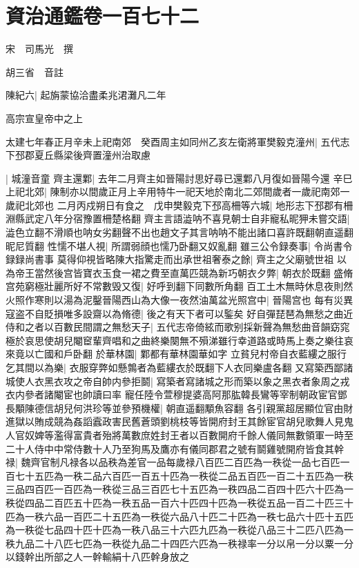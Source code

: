 \section{資治通鑑卷一百七十二}
宋　司馬光　撰

胡三省　音註

陳紀六|{
	起旃蒙協洽盡柔兆涒灘凡二年}


高宗宣皇帝中之上

太建七年春正月辛未上祀南郊　癸酉周主如同州乙亥左衛將軍樊毅克潼州|{
	五代志下邳郡夏丘縣梁後齊置潼州治取慮}


|{
	城潼音童}
齊主還鄴|{
	去年二月齊主如晉陽討思好尋已還鄴八月復如晉陽今還}
辛巳上祀北郊|{
	陳制亦以間歲正月上辛用特牛一祀天地於南北二郊間歲者一歲祀南郊一歲祀北郊也}
二月丙戍朔日有食之　戊申樊毅克下邳高柵等六城|{
	地形志下邳郡有柵淵縣武定八年分宿豫置柵楚格翻}
齊主言語澁呐不喜見朝士自非寵私昵狎未嘗交語|{
	澁色立翻不滑順也呐女劣翻聲不出也趙文子其言呐呐不能出諸口喜許既翻朝直遥翻昵尼質翻}
性懦不堪人視|{
	所謂弱顔也懦乃卧翻又奴亂翻}
雖三公令録奏事|{
	令尚書令録録尚書事}
莫得仰視皆略陳大指驚走而出承世祖奢泰之餘|{
	齊主之父廟號世祖}
以為帝王當然後宫皆寶衣玉食一裙之費至直萬匹競為新巧朝衣夕弊|{
	朝衣於既翻}
盛脩宫苑窮極壯麗所好不常數毁又復|{
	好呼到翻下同數所角翻}
百工土木無時休息夜則然火照作寒則以湯為泥鑿晉陽西山為大像一夜然油萬盆光照宫中|{
	晉陽宫也}
每有災異寇盗不自貶損唯多設齋以為脩德|{
	後之有天下者可以鍳矣}
好自彈琵琶為無愁之曲近侍和之者以百數民間謂之無愁天子|{
	五代志帝倚絃而歌别採新聲為無愁曲音韻窈窕極於哀思使胡兒閹䆠輩齊唱和之曲終樂闋無不殞涕雖行幸道路或時馬上奏之樂往哀來竟以亡國和戶卧翻}
於華林園|{
	鄴都有華林園華如字}
立貧兒村帝自衣藍縷之服行乞其間以為樂|{
	衣服穿弊如懸鶉者為藍縷衣於既翻下人衣同樂盧各翻}
又寫築西鄙諸城使人衣黑衣攻之帝自帥内參拒鬬|{
	寫築者寫諸城之形而築以象之黑衣者象周之戎衣内參者諸閹宦也帥讀曰率}
寵任陸令萱穆提婆高阿那肱韓長鸞等宰制朝政宦官鄧長顒陳德信胡兒何洪珍等並參預機權|{
	朝直遥翻顒魚容翻}
各引親黨超居顯位官由財進獄以賄成競為姦謟蠧政害民舊蒼頭劉桃枝等皆開府封王其餘宦官胡兒歌舞人見鬼人官奴婢等濫得富貴者殆將萬數庶姓封王者以百數開府千餘人儀同無數領軍一時至二十人侍中中常侍數十人乃至狗馬及鷹亦有儀同郡君之號有鬬雞號開府皆食其幹禄|{
	魏齊官制凡禄各以品秩為差官一品每歲禄八百匹二百匹為一秩從一品七百匹一百七十五匹為一秩二品六百匹一百五十匹為一秩從二品五百匹一百二十五匹為一秩三品四百匹一百匹為一秩從三品三百匹七十五匹為一秩四品二百四十匹六十匹為一秩從四品二百匹五十匹為一秩五品一百六十匹四十匹為一秩從五品一百二十匹三十匹為一秩六品一百匹二十五匹為一秩從六品八十匹二十匹為一秩七品六十匹十五匹為一秩從七品四十匹十匹為一秩八品三十六匹九匹為一秩從八品三十二匹八匹為一秩九品二十八匹七匹為一秩從九品二十四匹六匹為一秩禄率一分以帛一分以粟一分以錢幹出所部之人一幹輸絹十八匹幹身放之}

